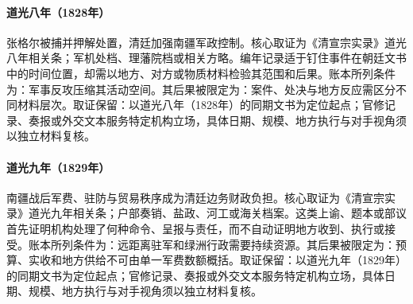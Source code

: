 \hypertarget{ledger:EQ-1828-JAHANGIR-CAPTURE}{}\paragraph{道光八年（1828年）}张格尔被捕并押解处置，清廷加强南疆军政控制。核心取证为《清宣宗实录》道光八年相关条；军机处档、理藩院档或相关方略。编年记录适于钉住事件在朝廷文书中的时间位置，却需以地方、对方或物质材料检验其范围和后果。账本所列条件为：军事反攻压缩其活动空间。其后果被限定为：案件、处决与地方反应需区分不同材料层次。取证保留：以道光八年（1828年）的同期文书为定位起点；官修记录、奏报或外交文本服务特定机构立场，具体日期、规模、地方执行与对手视角须以独立材料复核。
\hypertarget{ledger:EQ-1829-XINJIANG-FINANCE}{}\paragraph{道光九年（1829年）}南疆战后军费、驻防与贸易秩序成为清廷边务财政负担。核心取证为《清宣宗实录》道光九年相关条；户部奏销、盐政、河工或海关档案。这类上谕、题本或部议首先证明机构处理了何种命令、呈报与责任，而不自动证明地方收到、执行或接受。账本所列条件为：远距离驻军和绿洲行政需要持续资源。其后果被限定为：预算、实收和地方供给不可由单一军费数额概括。取证保留：以道光九年（1829年）的同期文书为定位起点；官修记录、奏报或外交文本服务特定机构立场，具体日期、规模、地方执行与对手视角须以独立材料复核。
